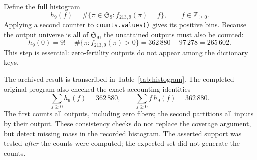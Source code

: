 \documentclass[11pt,a4paper]{article}
\begin{document}
Define the full histogram
\[
 h_9(f)=\#\{\pi\in\mathfrak S_9:f_{213,9}(\pi)=f\},
 \qquad f\in\mathbb Z_{\ge0}.
\]
Applying a second counter to \texttt{counts.values()} gives its positive
bins. Because the output universe is all of $\mathfrak S_9$, the
unattained outputs must also be counted:
\begin{equation}\label{eq:zero}
 h_9(0)=9!-\#\{\pi:f_{213,9}(\pi)>0\}
       =362\,880-97\,278=265\,602.
\end{equation}
This step is essential: zero-fertility outputs do not appear among
the dictionary keys.

The archived result is transcribed in Table~\ref{tab:histogram}. The
completed original program also checked the exact accounting identities
\begin{equation}\label{eq:accounting}
 \sum_{f\ge0}h_9(f)=362\,880,
 \qquad \sum_{f\ge0}f\,h_9(f)=362\,880.
\end{equation}
The first counts all outputs, including zero fibers; the second
partitions all inputs by their output. These consistency checks do
not replace the coverage argument, but detect missing mass in the
recorded histogram. The asserted support was tested \emph{after} the
counts were computed; the expected set did not generate the counts.
\end{document}
